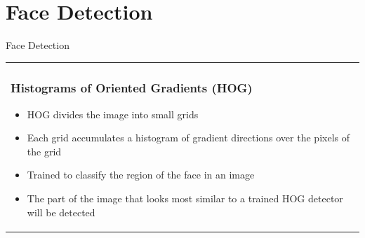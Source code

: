 \documentclass[11pt]{beamer}
\begin{document}
\section{Face Detection}
\begin{frame}{Face Detection}
\begin{tabular}{l}
\parbox{1\linewidth}{
\frametitle{Histograms of Oriented Gradients (HOG)}
\begin{itemize}
\item HOG divides the image into small grids
\item Each grid accumulates a histogram of gradient directions over the pixels of the grid
\item Trained to classify the region of the face in an image
\item The part of the image that looks most similar to a trained HOG detector will be detected 
\end{itemize}

}
\end{tabular}
\end{frame}
\end{document}
